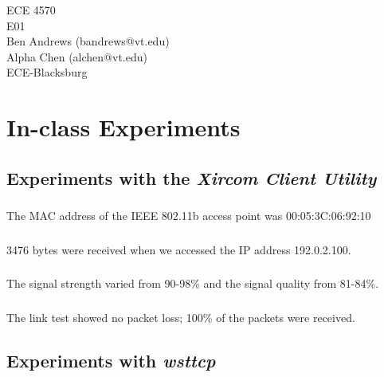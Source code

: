 \documentclass[11pt]{article}
\begin{document}
\begin{flushright}
{ECE 4570}\\{E01}\\{Ben Andrews (bandrews@vt.edu)}\\{Alpha Chen (alchen@vt.edu)}\\{ECE-Blacksburg}\end{flushright}


\section{In-class Experiments}

\subsection{Experiments with the \emph{Xircom Client Utility}}

\subsubsection{}

The MAC address of the IEEE 802.11b access point was 00:05:3C:06:92:10

\subsubsection{}

3476 bytes were received when we accessed the IP address 192.0.2.100.

\subsubsection{}

The signal strength varied from 90-98\% and the signal quality from 81-84\%.

\subsubsection{}

The link test showed no packet loss; 100\% of the packets were received.

\subsection{Experiments with \emph{wsttcp}}

\subsubsection{}
\end{document}
